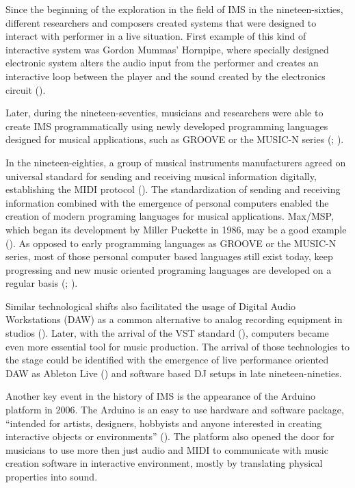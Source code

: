 \documentclass[a4paper,11pt]{article}
\begin{document}
Since the beginning of the exploration in the field of IMS in the nineteen-sixties, different researchers and composers created systems that were designed to interact with performer in a live situation.
First example of this kind of interactive system was Gordon Mummas' Hornpipe, where specially designed electronic system alters the audio input from the performer and creates an interactive loop between the player and the sound created by the electronics circuit (\cite[p. 12]{winkler01}).

Later, during the nineteen-seventies, musicians and researchers were able to create IMS programmatically using newly developed programming languages designed for musical applications, such as GROOVE or the MUSIC-N series (\cite{mathews70}; \cite{mathews69}).

In the nineteen-eighties, a group of musical instruments manufacturers agreed on universal standard for sending and receiving musical information digitally, establishing the MIDI protocol (\cite{web:quinn}).
The standardization of sending and receiving information combined with the emergence of personal computers enabled the creation of modern programing languages for musical applications.
Max/MSP, which began its development by Miller Puckette in 1986, may be a good example (\cite[p. 16]{winkler01}).
As opposed to early programming languages as GROOVE or the MUSIC-N series, most of those personal computer based languages still exist today, keep progressing and new music oriented programing languages are developed on a regular basis (\citeauthor{web:chuck}; \citeauthor{web:usine}).

Similar technological shifts also facilitated the usage of Digital Audio Workstations (DAW) as a common alternative to analog recording equipment in studios ().
Later, with the arrival of the VST standard (\citeauthor{web:steinberg}), computers became even more essential tool for music production.
The arrival of those technologies to the stage could be identified with the emergence of live performance oriented DAW as Ableton Live (\citeauthor{web:live}) and software based DJ setups in late nineteen-nineties.

Another key event in the history of IMS is the appearance of the Arduino platform in 2006.
The Arduino is an easy to use hardware and software package, ``intended for artists, designers, hobbyists and anyone interested in creating interactive objects or environments'' (\citeauthor{web:arduino}).
The platform also opened the door for musicians to use more then just audio and MIDI to communicate with music creation software in interactive environment, mostly by translating physical properties into sound.
\end{document}
